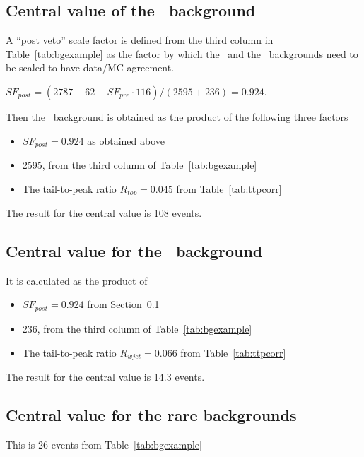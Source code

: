 \subsection{Central value of the \ttsl\ background}
\label{sec:cenvttlj}
A ``post veto'' scale factor is defined from the third column in Table~\ref{tab:bgexample} as the factor by which
the \ttsl\ and the \wjets\ backgrounds need to be scaled to have data/MC agreement.  

\noindent $SF_{post} = (2787 - 62 - SF_{pre} \cdot 116) / (2595 + 236) = 0.924$.

Then the \ttsl\ background is obtained as the product of the following three factors

\begin{itemize}
\item $SF_{post} = 0.924$ as obtained above
\item 2595, from the third column of Table~\ref{tab:bgexample}
\item The tail-to-peak ratio $R_{top} = 0.045$ from Table~\ref{tab:ttpcorr}
\end{itemize}

The result for the central value is 108 events.

\subsection{Central value for the \wjets\ background}

It is calculated as the product of
\begin{itemize}
\item $SF_{post} = 0.924$ from Section~\ref{sec:cenvttlj}
\item 236, from the third column of Table~\ref{tab:bgexample}
\item The tail-to-peak ratio $R_{wjet} = 0.066$ from Table~\ref{tab:ttpcorr}
\end{itemize}

The result for the central value is 14.3 events.

\subsection{Central value for the rare backgrounds}

This is 26 events from Table~\ref{tab:bgexample}

